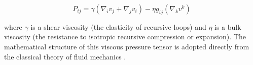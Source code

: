 \begin{equation}
P_{ij} = \gamma(\nabla_i v_j + \nabla_j v_i) - \eta g_{ij} (\nabla_k v^k)
\end{equation}

where \(\gamma\) is a shear viscosity (the elasticity of recursive loops) and \(\eta\) is a bulk viscosity (the resistance to isotropic recursive compression or expansion). The mathematical structure of this viscous pressure tensor is adopted directly from the classical theory of fluid mechanics \autocite{LandauLifshitz1987}.